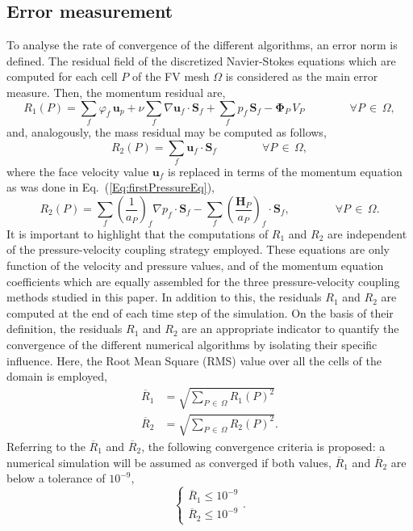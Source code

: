 \documentclass[final,3p,times,11pt,onecolumn]{myElsarticle}
\numberwithin{equation}{section}
\begin{document}
\subsection{Error measurement}
To analyse the rate of convergence of the different algorithms, an error norm is defined. The residual field of the discretized Navier-Stokes equations which are computed for each cell $P$ of the FV mesh $\Omega$ is considered as the main error measure. Then, the momentum residual are,
\begin{equation}
\label{Eq:R1Discretized}
R_1(P)
=
\sum_{f}
\varphi_f\,
\boldsymbol{u}_p
+
\nu
\sum_f
\nabla \boldsymbol{u}_f
\cdot
\boldsymbol{S}_f
+
\sum_f
p_f
\,
\boldsymbol{S}_f
-
\boldsymbol{\Phi}_P \, V_P
\qquad \qquad
\forall P\,\in\,\Omega,
\end{equation}
and, analogously, the mass residual may be computed as follows,
\begin{equation}
R_2(P)
=
\sum_f
\boldsymbol{u}_f
\cdot
\boldsymbol{S}_f
\qquad \qquad
\forall P\,\in\,\Omega,
\end{equation}
where the face velocity value $\boldsymbol{u}_f$ is replaced in terms of the momentum equation as was done in Eq.~(\ref{Eq:firstPressureEq}),
\begin{equation}
\label{Eq:R2Discretized}
R_2(P)
=
\sum_f 
\left(
\frac{1}{a_P}
\right)_f 
\nabla p_f
\cdot
\boldsymbol{S}_f 
-
\sum_f
\left(
\frac{\boldsymbol{H}_P}
{a_P}
\right)_f 
\cdot 
\boldsymbol{S}_f,
\qquad \qquad
\forall P\,\in\,\Omega.
\end{equation}
It is important to highlight that the computations of $R_1$ and $R_2$ are independent of the pressure-velocity coupling strategy employed. These equations are only function of the velocity and pressure values, and of the momentum equation coefficients which are equally assembled for the three pressure-velocity coupling methods studied in this paper. In addition to this, the residuals $R_1$ and $R_2$ are computed at the end of each time step of the simulation. 
On the basis of their definition, the residuals $R_1$ and $R_2$ are an appropriate indicator to quantify the convergence of the different numerical algorithms by isolating their specific influence. Here, the Root Mean Square (RMS) value over all the cells of the domain is employed, 
\begin{align}
\overline{R}_1
&=
\sqrt
{
\sum_{P\,\in\,\Omega}
R_1(P)^2
}
\\
\overline{R}_2
&=
\sqrt
{
\sum_{P\,\in\,\Omega}
R_2(P)^2
}.
\end{align}
Referring to the $\overline{R}_1$ and $\overline{R}_2$, the following convergence criteria is proposed: a numerical simulation will be assumed as converged if both values, $\overline{R}_1$ and $\overline{R}_2$  are below a tolerance of $10^{-9}$,
\begin{equation}
\label{Eq:convergenceCriteria}
\left\lbrace
\begin{array}{c}
\overline{R}_1 \leq 10^{-9} \\
\overline{R}_2 \leq 10^{-9}
\end{array}
\right..
\end{equation}
\end{document}
